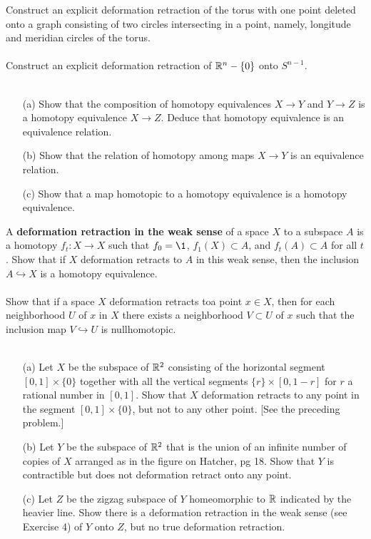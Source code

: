 
 Construct an explicit deformation retraction of the torus with one point deleted onto a graph consisting of two circles intersecting in a point, namely, longitude and meridian circles of the torus.
\\
\\
 Construct an explicit deformation retraction of $\mathbb{R}^n-\{0\}$ onto $S^{n-1}$.
\\
\\
\begin{itemize}
\item[(a)] Show that the composition of homotopy equivalences $X\to Y$ and $Y\to Z$ is a homotopy equivalence $X\to Z$. Deduce that homotopy equivalence is an equivalence relation.
\item[(b)] Show that the relation of homotopy among maps $X\to Y$ is an equivalence relation.
\item[(c)] Show that a map homotopic to a homotopy equivalence is a homotopy equivalence.
\end{itemize}

 A {\bf{deformation retraction in the weak sense}} of a space $X$ to a subspace $A$ is a homotopy $f_t\colon X\to X$ such that $f_0=\1$, $f_1(X)\subset A$, and $f_t(A)\subset A$ for all $t$. Show that if $X$ deformation retracts to $A$ in this weak sense, then the inclusion $A\hookrightarrow X$ is a homotopy equivalence.
\\
\\
 Show that if a space $X$ deformation retracts toa  point $x\in X$, then for each neighborhood $U$ of $x$ in $X$ there exists a neighborhood $V\subset U$ of $x$ such that the inclusion map $V\hookrightarrow U$ is nullhomotopic.
\\
\\
\begin{itemize}
\item[(a)] Let $X$ be the subspace of $\mathbb{R}^2$ consisting of the horizontal segment $[0,1]\times\{0\}$ together with all the vertical segments $\{r\}\times [0,1-r]$ for $r$ a rational number in $[0,1]$. Show that $X$ deformation retracts to any point in the segment $[0,1]\times\{0\}$, but not to any other point. [See the preceding problem.]
\item[(b)] Let $Y$ be the subspace of $\mathbb{R}^2$ that is the union of an infinite number of copies of $X$ arranged as in the figure on Hatcher, pg 18. Show that $Y$ is contractible but does not deformation retract onto any point.
\item[(c)] Let $Z$ be the zigzag subspace of $Y$ homeomorphic to $\mathbb{R}$ indicated by the heavier line. Show there is a deformation retraction in the weak sense (see Exercise 4) of $Y$ onto $Z$, but no true deformation retraction.
\end{itemize}

